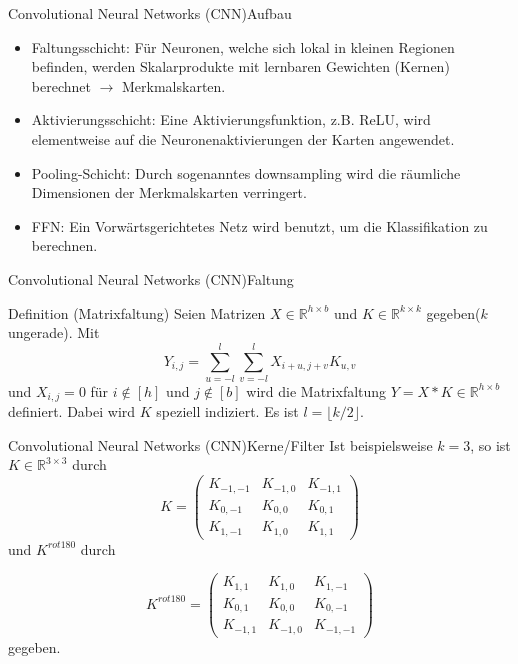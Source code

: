 \documentclass[10pt]{beamer} %
\newcommand{\RR}{\ensuremath{\mathbb{R}}}
\begin{document}
\begin{frame}{Convolutional Neural Networks (CNN)}{Aufbau}
   \begin{itemize}
      \pause
      \item Faltungsschicht: Für Neuronen, welche sich lokal in kleinen Regionen befinden, werden Skalarprodukte mit lernbaren Gewichten (Kernen) berechnet $\rightarrow$ Merkmalskarten.
      \pause
      \item Aktivierungsschicht: Eine Aktivierungsfunktion, z.B. ReLU, wird elementweise auf die Neuronenaktivierungen der Karten angewendet.
      \pause
      \item Pooling-Schicht: Durch sogenanntes downsampling wird die räumliche Dimensionen der Merkmalskarten verringert.
      \pause
      \item FFN: Ein Vorwärtsgerichtetes Netz wird benutzt, um die Klassifikation zu berechnen.
   \end{itemize}
\end{frame}

\begin{frame}{Convolutional Neural Networks (CNN)}{Faltung}
   \begin{block}{Definition (Matrixfaltung)}
      Seien Matrizen $X \in \RR^{h \times b}$ und $K \in \RR^{k \times k}$ gegeben($k$ ungerade). Mit
      \begin{equation*}
          \label{eq:valid_cross}
          Y_{i,j}=\sum_{u=-l}^l \sum_{v=-l}^l X_{i+u,j+v}K_{u,v}
      \end{equation*}
      und $X_{i,j}=0$ für $i \notin [h]$ und $j \notin [b]$ wird die Matrixfaltung $Y= X \ast K \in \RR^{h \times b}$ definiert. Dabei wird $K$ speziell indiziert. Es ist $l=\lfloor k/2 \rfloor$.
   \end{block}
\end{frame}

\begin{frame}{Convolutional Neural Networks (CNN)}{Kerne/Filter}
   Ist beispielsweise $k=3$, so ist $K \in \RR^{3 \times 3}$ durch
    \begin{equation*}
        K=\begin{pmatrix}
            K_{-1,-1} &K_{-1,0} &K_{-1,1} \\
            K_{0,-1} &K_{0,0} &K_{0,1}  \\
            K_{1,-1} &K_{1,0} &K_{1,1} 
        \end{pmatrix}
    \end{equation*} und $K^{rot180}$ durch

    \begin{equation*}
        K^{rot180}=\begin{pmatrix}
            K_{1,1} &K_{1,0} &K_{1,-1} \\
            K_{0,1} &K_{0,0} &K_{0,-1}  \\
            K_{-1,1} &K_{-1,0} &K_{-1,-1} 
        \end{pmatrix}
    \end{equation*}
    gegeben.
\end{frame}
\end{document}
